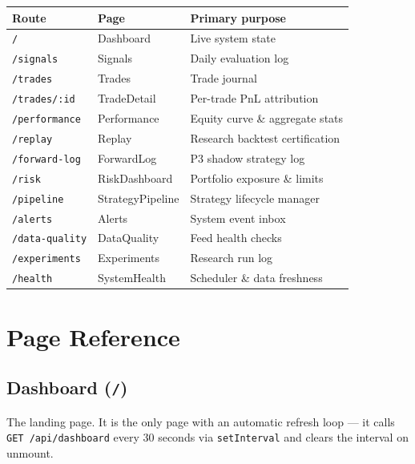 \documentclass[12pt, a4paper]{article}
\begin{document}
\begin{table}[H]
\centering\small
\begin{tabular}{lll}
\toprule
Route & Page & Primary purpose \\
\midrule
\texttt{/}              & Dashboard         & Live system state \\
\texttt{/signals}       & Signals           & Daily evaluation log \\
\texttt{/trades}        & Trades            & Trade journal \\
\texttt{/trades/:id}    & TradeDetail       & Per-trade PnL attribution \\
\texttt{/performance}   & Performance       & Equity curve \& aggregate stats \\
\texttt{/replay}        & Replay            & Research backtest certification \\
\texttt{/forward-log}   & ForwardLog        & P3 shadow strategy log \\
\texttt{/risk}          & RiskDashboard     & Portfolio exposure \& limits \\
\texttt{/pipeline}      & StrategyPipeline  & Strategy lifecycle manager \\
\texttt{/alerts}        & Alerts            & System event inbox \\
\texttt{/data-quality}  & DataQuality       & Feed health checks \\
\texttt{/experiments}   & Experiments       & Research run log \\
\texttt{/health}        & SystemHealth      & Scheduler \& data freshness \\
\bottomrule
\end{tabular}
\end{table}


\section{Page Reference}

\subsection{Dashboard (\texttt{/})}
\label{sec:dashboard}

The landing page. It is the only page with an automatic refresh loop — it
calls \texttt{GET /api/dashboard} every 30 seconds via \texttt{setInterval}
and clears the interval on unmount.
\end{document}
